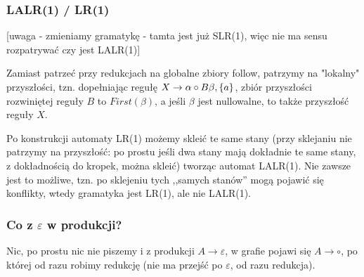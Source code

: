 \subsubsection{LALR(1) / LR(1)}

[uwaga - zmieniamy gramatykę - tamta jest już SLR(1), więc nie ma sensu rozpatrywać czy jest LALR(1)]

Zamiast patrzeć przy redukcjach na globalne zbiory follow, patrzymy na "lokalny" przyszłości, tzn. dopełniając regułę $X \rightarrow \alpha \circ B \beta, \{a \}$, zbiór przyszłości rozwiniętej reguły $B$ to $First(\beta)$, a jeśli $\beta$ jest nullowalne, to także przyszłość reguły $X$.

Po konstrukcji automaty LR(1) możemy skleić te same stany (przy sklejaniu nie patrzymy na przyszłość: po prostu jeśli dwa stany mają dokładnie te same stany, z dokładnością do kropek, można skleić) tworząc automat LALR(1). Nie zawsze jest to możliwe, tzn. po sklejeniu tych ,,samych stanów'' mogą pojawić się konflikty, wtedy gramatyka jest LR(1), ale nie LALR(1).



\subsubsection{Co z $\varepsilon$ w produkcji?}

Nic, po prostu nic nie piszemy i z produkcji $A \rightarrow \varepsilon$, w grafie pojawi się $A \rightarrow \circ $, po której od razu robimy redukcję (nie ma przejść po $\varepsilon$, od razu redukcja).